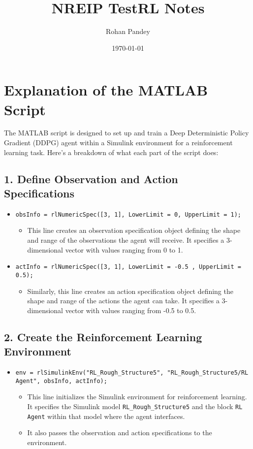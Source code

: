 \documentclass[12pt]{article}
\title{NREIP TestRL Notes}
\author{Rohan Pandey}
\date{\today}
\begin{document}
\maketitle

\section*{Explanation of the MATLAB Script}

The MATLAB script is designed to set up and train a Deep Deterministic Policy Gradient (DDPG) agent within a Simulink environment for a reinforcement learning task. Here's a breakdown of what each part of the script does:

\subsection*{1. Define Observation and Action Specifications}

\begin{itemize}
    \item \texttt{obsInfo = rlNumericSpec([3, 1], LowerLimit = 0, UpperLimit = 1);}
    \begin{itemize}
        \item This line creates an observation specification object defining the shape and range of the observations the agent will receive. It specifies a 3-dimensional vector with values ranging from 0 to 1.
    \end{itemize}
    \item \texttt{actInfo = rlNumericSpec([3, 1], LowerLimit = -0.5 , UpperLimit = 0.5);}
    \begin{itemize}
        \item Similarly, this line creates an action specification object defining the shape and range of the actions the agent can take. It specifies a 3-dimensional vector with values ranging from -0.5 to 0.5.
    \end{itemize}
\end{itemize}

\subsection*{2. Create the Reinforcement Learning Environment}

\begin{itemize}
    \item \texttt{env = rlSimulinkEnv("RL\_Rough\_Structure5", "RL\_Rough\_Structure5/RL Agent", obsInfo, actInfo);}
    \begin{itemize}
        \item This line initializes the Simulink environment for reinforcement learning. It specifies the Simulink model \texttt{RL\_Rough\_Structure5} and the block \texttt{RL Agent} within that model where the agent interfaces.
        \item It also passes the observation and action specifications to the environment.
    \end{itemize}
\end{itemize}
\end{document}
